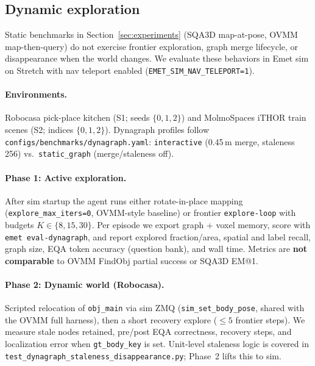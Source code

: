 \subsection{Dynamic exploration}
\label{sec:dynamic_exploration}

Static benchmarks in Section~\ref{sec:experiments} (SQA3D map-at-pose, OVMM map-then-query) do not exercise frontier exploration, graph merge lifecycle, or disappearance when the world changes.
We evaluate these behaviors in Emet sim on Stretch with nav teleport enabled (\texttt{EMET\_SIM\_NAV\_TELEPORT=1}).

\paragraph{Environments.}
Robocasa pick-place kitchen (S1; seeds $\{0,1,2\}$) and MolmoSpaces iTHOR train scenes (S2; indices $\{0,1,2\}$).
Dynagraph profiles follow \texttt{configs/benchmarks/dynagraph.yaml}: \texttt{interactive} (0.45\,m merge, staleness 256) vs.\ \texttt{static\_graph} (merge/staleness off).

\paragraph{Phase 1: Active exploration.}
After sim startup the agent runs either rotate-in-place mapping (\texttt{explore\_max\_iters=0}, OVMM-style baseline) or frontier \texttt{explore-loop} with budgets $K \in \{8,15,30\}$.
Per episode we export graph + voxel memory, score with \texttt{emet eval-dynagraph}, and report explored fraction/area, spatial and label recall, graph size, EQA token accuracy (question bank), and wall time.
Metrics are \textbf{not comparable} to OVMM FindObj partial success or SQA3D EM@1.

\paragraph{Phase 2: Dynamic world (Robocasa).}
Scripted relocation of \texttt{obj\_main} via sim ZMQ (\texttt{sim\_set\_body\_pose}, shared with the OVMM full harness), then a short recovery explore ($\leq 5$ frontier steps).
We measure stale nodes retained, pre/post EQA correctness, recovery steps, and localization error when \texttt{gt\_body\_key} is set.
Unit-level staleness logic is covered in \texttt{test\_dynagraph\_staleness\_disappearance.py}; Phase~2 lifts this to sim.

